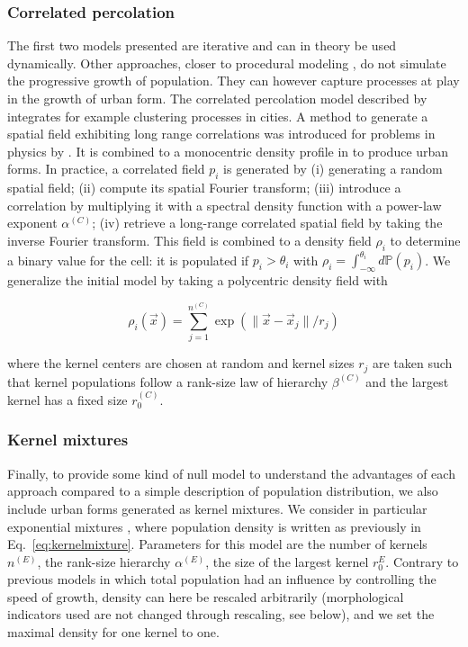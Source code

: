 \documentclass[10pt,letterpaper]{article}
\begin{document}
\subsubsection*{Correlated percolation}

The first two models presented are iterative and can in theory be used dynamically. Other approaches, closer to procedural modeling \cite{parish2001procedural}, do not simulate the progressive growth of population. They can however capture processes at play in the growth of urban form. The correlated percolation model described by \cite{makse1998modeling} integrates for example clustering processes in cities. A method to generate a spatial field exhibiting long range correlations was introduced for problems in physics by \cite{makse1996method}. It is combined to a monocentric density profile in \cite{makse1998modeling} to produce urban forms. In practice, a correlated field $p_i$ is generated by (i) generating a random spatial field; (ii) compute its spatial Fourier transform; (iii) introduce a correlation by multiplying it with a spectral density function with a power-law exponent $\alpha^{(C)}$; (iv) retrieve a long-range correlated spatial field by taking the inverse Fourier transform. This field is combined to a density field $\rho_i$ to determine a binary value for the cell: it is populated if $p_i > \theta_i$ with $\rho_i = \int_{-\infty}^{\theta_i} d\mathbb{P}(p_i)$. We generalize the initial model by taking a polycentric density field with 

\begin{equation}
\rho_i (\vec{x}) = \sum_{j=1}^{n^{(C)}} \exp\left(\lVert\vec{x} - \vec{x}_j\rVert / r_j\right)
\label{eq:kernelmixture}
\end{equation}

where the kernel centers are chosen at random and kernel sizes $r_j$ are taken such that kernel populations follow a rank-size law of hierarchy $\beta^{(C)}$ and the largest kernel has a fixed size $r_0^{(C)}$.

\subsubsection*{Kernel mixtures}

Finally, to provide some kind of null model to understand the advantages of each approach compared to a simple description of population distribution, we also include urban forms generated as kernel mixtures. We consider in particular exponential mixtures \cite{anas1998urban}, where population density is written as previously in Eq.~\ref{eq:kernelmixture}. Parameters for this model are the number of kernels $n^{(E)}$, the rank-size hierarchy $\alpha^{(E)}$, the size of the largest kernel $r_0^{E}$. Contrary to previous models in which total population had an influence by controlling the speed of growth, density can here be rescaled arbitrarily (morphological indicators used are not changed through rescaling, see below), and we set the maximal density for one kernel to one.
\end{document}
